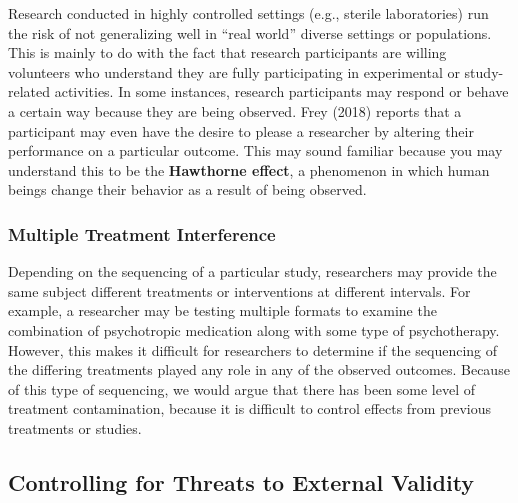 \documentclass[
  11pt,
]{book}
\begin{document}
Research conducted in highly controlled settings (e.g., sterile laboratories) run the risk of not generalizing well in ``real world'' diverse settings or populations. This is mainly to do with the fact that research participants are willing volunteers who understand they are fully participating in experimental or study-related activities. In some instances, research participants may respond or behave a certain way because they are being observed. Frey (2018) reports that a participant may even have the desire to please a researcher by altering their performance on a particular outcome. This may sound familiar because you may understand this to be the \textbf{Hawthorne effect}, a phenomenon in which human beings change their behavior as a result of being observed.

\subsubsection{Multiple Treatment Interference}\label{multiple-treatment-interference}

Depending on the sequencing of a particular study, researchers may provide the same subject different treatments or interventions at different intervals. For example, a researcher may be testing multiple formats to examine the combination of psychotropic medication along with some type of psychotherapy. However, this makes it difficult for researchers to determine if the sequencing of the differing treatments played any role in any of the observed outcomes. Because of this type of sequencing, we would argue that there has been some level of treatment contamination, because it is difficult to control effects from previous treatments or studies.

\subsection{Controlling for Threats to External Validity}\label{controlling-for-threats-to-external-validity}
\end{document}
